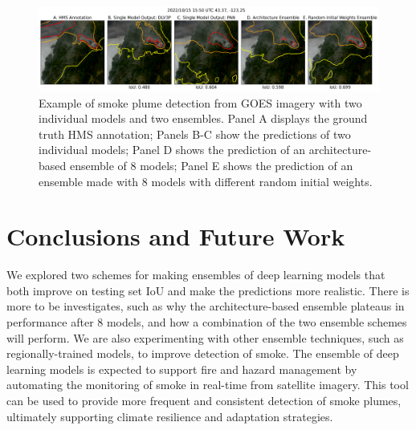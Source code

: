 \documentclass{article}
\begin{document}
\begin{figure}[h]
    \centering
    \includegraphics[width=\textwidth]{ensemble_panel_tinypaper.png}
    \caption{Example of smoke plume detection from GOES imagery with two individual models and two ensembles. Panel A displays the ground truth HMS annotation; Panels B-C show the predictions of two individual models; Panel D shows the prediction of an architecture-based ensemble of 8 models; Panel E shows the prediction of an ensemble made with 8 models with different random initial weights.}
    \label{fig:ensemble_panel}
\end{figure}
\section{Conclusions and Future Work}
We explored two schemes for making ensembles of deep learning models that both improve on testing set IoU and make the predictions more realistic. There is more to be investigates, such as why the architecture-based ensemble plateaus in performance after 8 models, and how a combination of the two ensemble schemes will perform. We are also experimenting with other ensemble techniques, such as regionally-trained models, to improve detection of smoke. The ensemble of deep learning models is expected to support fire and hazard management by automating the monitoring of smoke in real-time from satellite imagery. This tool can be used to provide more frequent and consistent detection of smoke plumes, ultimately supporting climate resilience and adaptation strategies.


\end{document}
